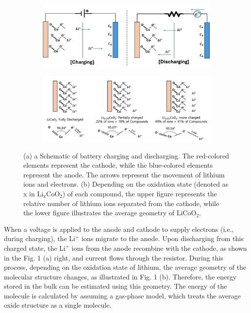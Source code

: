 \documentclass[pdflatex,sn-mathphys-num]{sn-jnl}%
\theoremstyle{thmstyleone}%
\theoremstyle{thmstyletwo}%
\theoremstyle{thmstylethree}%
\begin{document}
\begin{figure}[H]
  \centering
  \begin{subfigure}[b]{0.45\textwidth}
    \includegraphics[width=\textwidth]{fig/Cha_discha.png}
    \caption{}
    \label{fig:first}
  \end{subfigure}
  \hfill
  \hfill
  \begin{subfigure}[b]{0.45\textwidth}
    \includegraphics[width=\textwidth]{fig/char.png}
    \caption{}
    \label{fig:second}
  \end{subfigure}
  \caption{(a) a Schematic of battery charging and discharging. The red-colored elements represent the cathode, while the blue-colored elements represent the anode. The arrows represent the movement of lithium ions and electrons. (b) Depending on the oxidation state (denoted as x in \(\mathrm{Li_xCoO_2}\)) of each compound, the upper figure represents the relative number of lithium ions separated from the cathode, while the lower figure illustrates the average geometry of \(\mathrm{LiCoO_2}\).}
  \label{fig:two_figures_side_by_side}
\end{figure}
When a voltage is applied to the anode and cathode to supply electrons (i.e., during charging), the  \(\mathrm{Li^+}\) ions migrate to the anode. 
Upon discharging from this charged state, the \(\mathrm{Li^+}\) ions from the anode recombine with the cathode, as shown in the Fig. 1 (a) right, and current flows through the resistor. 
During this process, depending on the oxidation state of lithium, the average geometry of the molecular structure changes, as illustrated in Fig. 1 (b).
Therefore, the energy stored in the bulk can be estimated using this geometry. 
The energy of the molecule is calculated by assuming a gas-phase model, which treats the average oxide structure as a single molecule.
\end{document}
